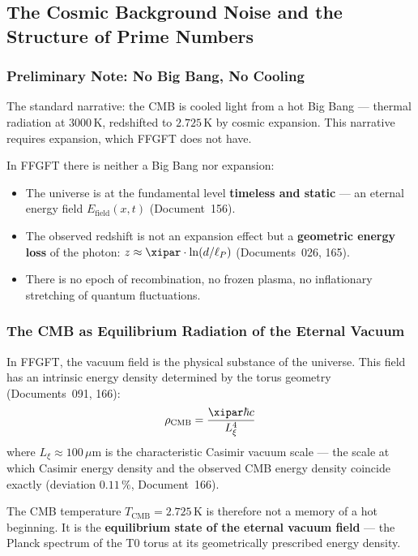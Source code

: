 \subsection{The Cosmic Background Noise and the Structure of Prime Numbers}

\subsubsection*{Preliminary Note: No Big Bang, No Cooling}

\begin{important}
The standard narrative: the CMB is cooled light from a hot Big Bang —
thermal radiation at $3000\,\text{K}$, redshifted to $2.725\,\text{K}$
by cosmic expansion. This narrative requires expansion, which FFGFT
does not have.

In FFGFT there is neither a Big Bang nor expansion:
\begin{itemize}
    \item The universe is at the fundamental level \textbf{timeless and static}
    — an eternal energy field $E_\text{field}(x,t)$ (Document~156).
    \item The observed redshift is not an expansion effect but a
    \textbf{geometric energy loss} of the photon:
    $z \approx \xipar \cdot \ln(d/\ell_P)$ (Documents~026, 165).
    \item There is no epoch of recombination, no frozen plasma,
    no inflationary stretching of quantum fluctuations.
\end{itemize}
\end{important}

\subsubsection*{The CMB as Equilibrium Radiation of the Eternal Vacuum}

In FFGFT, the vacuum field is the physical substance of the universe.
This field has an intrinsic energy density determined by the torus
geometry (Documents~091, 166):
\begin{equation}
    \rho_\text{CMB} = \frac{\xipar \hbar c}{L_\xi^4}
\end{equation}
where $L_\xi \approx 100\,\mu\text{m}$ is the characteristic Casimir
vacuum scale — the scale at which Casimir energy density and the observed
CMB energy density coincide exactly (deviation $0.11\,\%$, Document~166).

The CMB temperature $T_\text{CMB} = 2.725\,\text{K}$ is therefore not
a memory of a hot beginning. It is the \textbf{equilibrium state of the
eternal vacuum field} — the Planck spectrum of the T0 torus at its
geometrically prescribed energy density.

